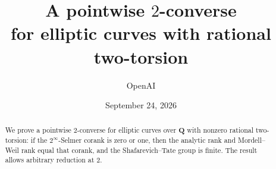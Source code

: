 \documentclass[11pt]{article}
\title{A pointwise $2$-converse\\for elliptic curves with rational two-torsion}
\author{OpenAI}
\date{September 24, 2026}
\numberwithin{equation}{section}
\theoremstyle{definition}
\theoremstyle{remark}
\begin{document}
\maketitle
\begin{abstract}
We prove a pointwise $2$-converse for elliptic curves over $\mathbf Q$
with nonzero rational two-torsion: if the $2^\infty$-Selmer corank is
zero or one, then the analytic rank and Mordell--Weil rank equal that
corank, and the Shafarevich--Tate group is finite. The result allows
arbitrary reduction at $2$.
\end{abstract}
\setcounter{tocdepth}{1}
\tableofcontents
\clearpage











\end{document}
